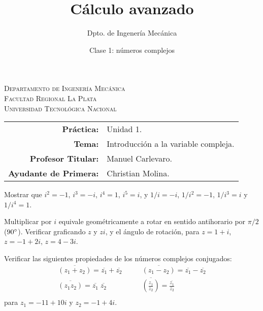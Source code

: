 \documentclass[11pt]{article}
\title{Cálculo avanzado}
\author{Dpto. de Ingenería Mecánica}
\date{Clase 1: números complejos}
\begin{document}

\begin{center}
\end{center} 

\begin{center}
\vspace{\baselineskip}
\Large{\textsc{Departamento de Ingenería Mecánica}} \\
\textsc{Facultad Regional La Plata} \\
\textsc{Universidad Tecnológica Nacional}
\end{center}


\begin{center}
\begin{tabular}{r l}
    \textbf{Práctica:} & Unidad 1. \\
 \textbf{Tema:} & Introducción a la variable compleja. \\
 \textbf{Profesor Titular:} & Manuel Carlevaro. \\
 \textbf{Ayudante de Primera:} & Christian Molina. \\
\end{tabular}\end{center}

\vspace{1em}

\begin{question} %
 Mostrar que $i^2 = -1$, $i^3 = -i$, $i^4 = 1$, $i^5 = i$, y $1/i = -i$, $1/i^2 = -1$, $1/i^3 = i$ y $1/i^4 = 1$.
\end{question}

\begin{question} %
 Multiplicar por $i$ equivale geométricamente a rotar en sentido antihorario por $\pi/2$ ($90\degree$). Verificar graficando $z$ y $zi$, y el ángulo de rotación, para $z = 1 + i$, $z = -1 + 2 i$, $z = 4 - 3 i$.
\end{question}

\begin{question} %
 Verificar las siguientes propiedades de los números complejos conjugados:
 \begin{align*}
  \overline{(z_1 + z_2)} = \overline{z_1} + \overline{z_2} &\qquad \overline{(z_1 - z_2)} = \overline{z_1} - \overline{z_2} \\
  \overline{(z_1 z_2)} = \overline{z_1} \; \overline{z_2} &\qquad \overline{ \left( \frac{z_1}{z_2} \right) } = \frac{\overline{z_1}}{\overline{z_2}} \\
 \end{align*}
 para $z_1 = -11 + 10 i$ y $z_2 = -1 + 4 i$.
\end{question}
\end{document}
